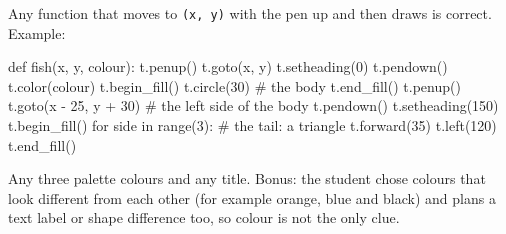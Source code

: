 \begin{answer}
Any function that moves to \texttt{(x, y)} with the pen up and then draws is correct. Example:
\begin{pycode}
def fish(x, y, colour):
    t.penup()
    t.goto(x, y)
    t.setheading(0)
    t.pendown()
    t.color(colour)
    t.begin_fill()
    t.circle(30)              # the body
    t.end_fill()
    t.penup()
    t.goto(x - 25, y + 30)    # the left side of the body
    t.pendown()
    t.setheading(150)
    t.begin_fill()
    for side in range(3):     # the tail: a triangle
        t.forward(35)
        t.left(120)
    t.end_fill()
\end{pycode}
\end{answer}

\begin{answer}
Any three palette colours and any title. Bonus: the student chose colours that look different from each other (for example orange, blue and black) and plans a text label or shape difference too, so colour is not the only clue.
\end{answer}
